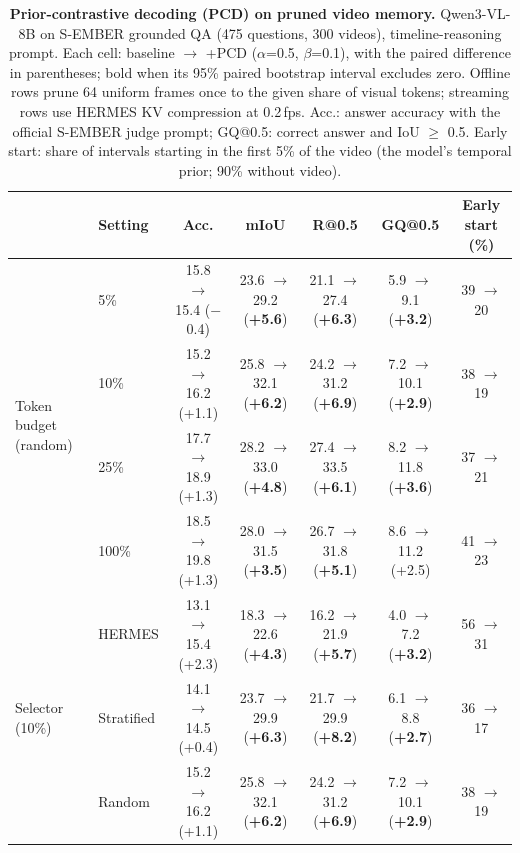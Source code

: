 \begin{table}[t]
\centering
\small
\setlength{\tabcolsep}{4pt}
\caption{\textbf{Prior-contrastive decoding (PCD) on pruned video memory.} Qwen3-VL-8B on S-EMBER grounded QA (475 questions, 300 videos), timeline-reasoning prompt. Each cell: baseline $\rightarrow$ +PCD ($\alpha$=0.5, $\beta$=0.1), with the paired difference in parentheses; bold when its 95\% paired bootstrap interval excludes zero. Offline rows prune 64 uniform frames once to the given share of visual tokens; streaming rows use HERMES KV compression at 0.2\,fps. Acc.: answer accuracy with the official S-EMBER judge prompt; GQ@0.5: correct answer and IoU $\geq$ 0.5. Early start: share of intervals starting in the first 5\% of the video (the model's temporal prior; 90\% without video).}
\label{tab:pcd-main}
\begin{tabular}{llccccc}
\toprule
& Setting & Acc. & mIoU & R@0.5 & GQ@0.5 & Early start (\%) \\
\midrule
\multirow{4}{*}{Token budget (random)} & 5\% & 15.8 $\rightarrow$ 15.4 ($-$0.4) & 23.6 $\rightarrow$ 29.2 (\textbf{+5.6}) & 21.1 $\rightarrow$ 27.4 (\textbf{+6.3}) & 5.9 $\rightarrow$ 9.1 (\textbf{+3.2}) & 39 $\rightarrow$ 20 \\
 & 10\% & 15.2 $\rightarrow$ 16.2 (+1.1) & 25.8 $\rightarrow$ 32.1 (\textbf{+6.2}) & 24.2 $\rightarrow$ 31.2 (\textbf{+6.9}) & 7.2 $\rightarrow$ 10.1 (\textbf{+2.9}) & 38 $\rightarrow$ 19 \\
 & 25\% & 17.7 $\rightarrow$ 18.9 (+1.3) & 28.2 $\rightarrow$ 33.0 (\textbf{+4.8}) & 27.4 $\rightarrow$ 33.5 (\textbf{+6.1}) & 8.2 $\rightarrow$ 11.8 (\textbf{+3.6}) & 37 $\rightarrow$ 21 \\
 & 100\% & 18.5 $\rightarrow$ 19.8 (+1.3) & 28.0 $\rightarrow$ 31.5 (\textbf{+3.5}) & 26.7 $\rightarrow$ 31.8 (\textbf{+5.1}) & 8.6 $\rightarrow$ 11.2 (+2.5) & 41 $\rightarrow$ 23 \\
\midrule
\multirow{3}{*}{Selector (10\%)} & HERMES & 13.1 $\rightarrow$ 15.4 (+2.3) & 18.3 $\rightarrow$ 22.6 (\textbf{+4.3}) & 16.2 $\rightarrow$ 21.9 (\textbf{+5.7}) & 4.0 $\rightarrow$ 7.2 (\textbf{+3.2}) & 56 $\rightarrow$ 31 \\
 & Stratified & 14.1 $\rightarrow$ 14.5 (+0.4) & 23.7 $\rightarrow$ 29.9 (\textbf{+6.3}) & 21.7 $\rightarrow$ 29.9 (\textbf{+8.2}) & 6.1 $\rightarrow$ 8.8 (\textbf{+2.7}) & 36 $\rightarrow$ 17 \\
 & Random & 15.2 $\rightarrow$ 16.2 (+1.1) & 25.8 $\rightarrow$ 32.1 (\textbf{+6.2}) & 24.2 $\rightarrow$ 31.2 (\textbf{+6.9}) & 7.2 $\rightarrow$ 10.1 (\textbf{+2.9}) & 38 $\rightarrow$ 19 \\

\end{tabular}
\end{table}
